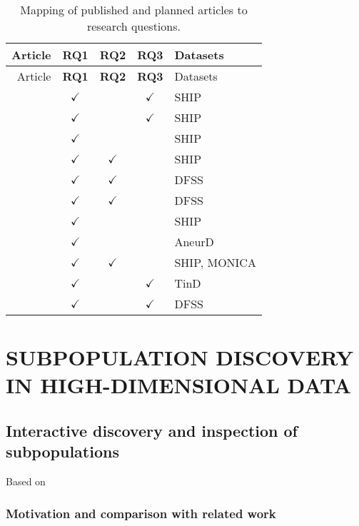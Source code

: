 \documentclass[
]{book}
\begin{document}
\begin{longtable}[]{@{}rcccl@{}}
\caption{\label{tab:mapping} Mapping of published and planned articles to research questions.}\tabularnewline
\toprule
Article & \textbf{RQ1} & \textbf{RQ2} & \textbf{RQ3} & Datasets\tabularnewline
\midrule
\endfirsthead
\toprule
Article & \textbf{RQ1} & \textbf{RQ2} & \textbf{RQ3} & Datasets\tabularnewline
\midrule
\endhead
\autocite{Niemann:ESWA2014} & \(\checkmark\) & & \(\checkmark\) & SHIP\tabularnewline
\autocite{Niemann:IMM2014} & \(\checkmark\) & & \(\checkmark\) & SHIP\tabularnewline
\autocite{NiemannEtAl:FCDS2014} & \(\checkmark\) & & & SHIP\tabularnewline
\autocite{Niemann:CBMS2015} & \(\checkmark\) & \(\checkmark\) & & SHIP\tabularnewline
\autocite{Niemann:CBMS2016} & \(\checkmark\) & \(\checkmark\) & & DFSS\tabularnewline
\autocite{Niemann:PONE2016} & \(\checkmark\) & \(\checkmark\) & & DFSS\tabularnewline
\autocite{Niemann:CBMS2017} & \(\checkmark\) & & & SHIP\tabularnewline
\autocite{Niemann:CBMS2018} & \(\checkmark\) & & & AneurD\tabularnewline
\autocite{Niemann:SREP2020} & \(\checkmark\) & \(\checkmark\) & & SHIP, MONICA\tabularnewline
\autocite{Niemann:SciRep2020} & \(\checkmark\) & & \(\checkmark\) & TinD\tabularnewline
\autocite{Niemann:EBioMedicine2020} & \(\checkmark\) & & \(\checkmark\) & DFSS\tabularnewline
\bottomrule
\end{longtable}

\hypertarget{part-subpopulation-discovery-in-high-dimensional-data}{%
\part{SUBPOPULATION DISCOVERY IN HIGH-DIMENSIONAL DATA}\label{part-subpopulation-discovery-in-high-dimensional-data}}

\hypertarget{imm}{%
\chapter{Interactive discovery and inspection of subpopulations}\label{imm}}

Based on \autocite{Niemann:ESWA2014}

\hypertarget{motivation-and-comparison-with-related-work}{%
\section{Motivation and comparison with related work}\label{motivation-and-comparison-with-related-work}}
\end{document}
